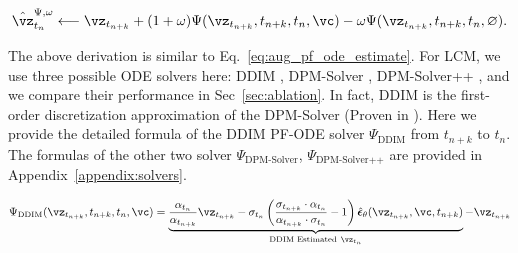 \documentclass{article} %
\newcommand{\jian}[1]{\textcolor{red}{#1}}
\begin{document}
\begin{small}
\begin{equation}
    \hat{\vz}^{\Psi, \omega}_{t_n}\longleftarrow \vz_{t_{n+k}} + (1+\omega)\Psi(\vz_{t_{n+k}},t_{n+k}, t_n, \vc)-\omega\Psi(\vz_{t_{n+k}},t_{n+k}, t_n, \varnothing). \label{eq:aug_pf_ode_final}
\end{equation}
\end{small}
The above derivation is similar to Eq.~\ref{eq:aug_pf_ode_estimate}. For LCM, we use three possible ODE solvers here: DDIM \citep{song2020denoising}, DPM-Solver \citep{lu2022dpm}, DPM-Solver++ \citep{lu2022dpm++}, and we compare their performance
in Sec~\ref{sec:ablation}.
In fact, DDIM \citep{song2020denoising} is the first-order discretization approximation of the DPM-Solver (Proven in \citep{lu2022dpm}).
Here we provide the detailed formula of the DDIM PF-ODE solver $\Psi_{\text{DDIM}}$ from $t_{n+k}$ to $t_n$. The formulas of the other two solver $\Psi_{\text{DPM-Solver}}$, $\Psi_{\text{DPM-Solver++}}$ are provided in Appendix~\ref{appendix:solvers}.
\begin{footnotesize}
\begin{equation}
    \begin{aligned}
    \Psi_{\text{DDIM}}(\vz_{t_{n+k}},t_{n+k}, t_n, \vc) = \underbrace{\frac{\alpha_{t_n}}{\alpha_{t_{n+k}}}\vz_{t_{n+k}} - \sigma_{t_n}\left(\frac{\sigma_{t_{n+k}}\cdot\alpha_{t_n}}{\alpha_{t_{n+k}}\cdot\sigma_{t_n}} - 1\right)\hat{\boldsymbol{\epsilon}}_\theta(\vz_{t_{n+k}},\vc,t_{n+k})}_{\text{DDIM Estimated} \ \vz_{t_{n}}} - \vz_{t_{n+k}}
    \end{aligned}
\end{equation}
\end{footnotesize}
\end{document}

